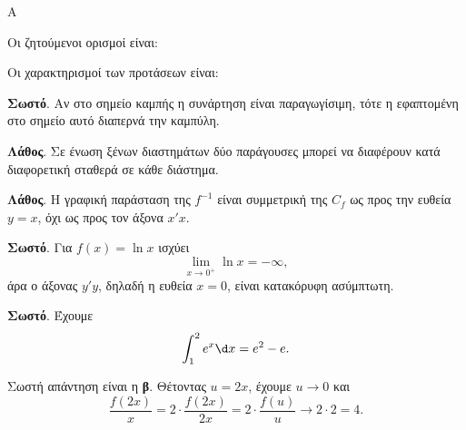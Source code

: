 \begin{thema}{Α}
\begin{erwthma}
\item {}

\item {}

\item Οι ζητούμενοι ορισμοί είναι:

\item Οι χαρακτηρισμοί των προτάσεων είναι:
\begin{alist}
\item \textbf{Σωστό}. Αν στο σημείο καμπής η συνάρτηση είναι παραγωγίσιμη, τότε η εφαπτομένη στο σημείο αυτό διαπερνά την καμπύλη.
\item \textbf{Λάθος}. Σε ένωση ξένων διαστημάτων δύο παράγουσες μπορεί να διαφέρουν κατά διαφορετική σταθερά σε κάθε διάστημα.
\item \textbf{Λάθος}. Η γραφική παράσταση της $f^{-1}$ είναι συμμετρική της $C_f$ ως προς την ευθεία $y=x$, όχι ως προς τον άξονα $x'x$.
\item \textbf{Σωστό}. Για $f(x)=\ln x$ ισχύει
\[ \lim_{x\to0^+}\ln x=-\infty, \]
άρα ο άξονας $y'y$, δηλαδή η ευθεία $x=0$, είναι κατακόρυφη ασύμπτωτη.
\item \textbf{Σωστό}. Έχουμε
\[ \dint_1^2 e^x\d x=e^2-e. \]
\end{alist}

\item Σωστή απάντηση είναι η \textbf{β}. Θέτοντας $u=2x$, έχουμε $u\to0$ και
\[ \dfrac{f(2x)}{x}=2\cdot\dfrac{f(2x)}{2x}=2\cdot\dfrac{f(u)}{u}\to 2\cdot2=4. \]
\end{erwthma}
\end{thema}

